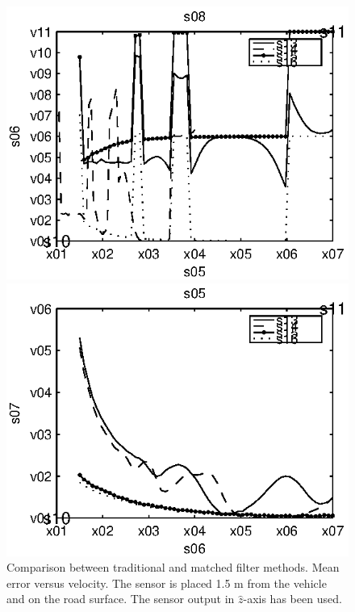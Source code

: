 \begin{subfigures}
\begin{figure}[!tbhf]
  \centering
  \begin{minipage}{0.45\linewidth}
  \centering
  
   \includegraphics[width=\linewidth]{images/mean_error-velocity}
  \caption[Time difference, method comparison. Mean error versus velocity]{Comparison between traditional and matched filter methods. Mean error versus velocity. The sensor is placed 1.5 m from the vehicle and on the road surface. The sensor output in $\hat{z}$-axis has been used.}
  \label{fig:comp_mean-vel}
  \end{minipage}\hfill
  \begin{minipage}{0.45\linewidth}
   \centering
   
   \includegraphics[width=\linewidth]{images/std_error-velocity}

\end{minipage}
\end{figure}
\end{subfigures}
